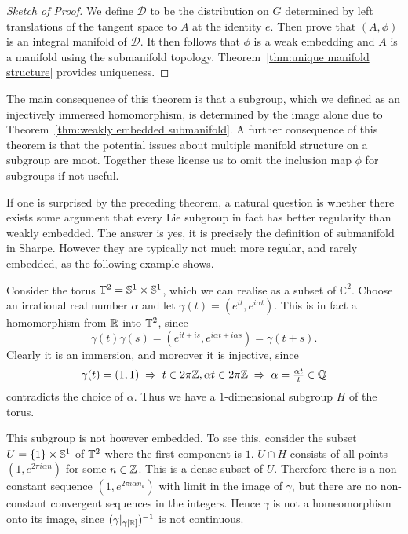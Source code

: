 \begin{proof}[Sketch of Proof]
We define $\mathcal{D}$ to be the distribution on $G$ determined by left translations of the tangent space to $A$ at the identity $e$. 
Then prove that $(A,\phi)$ is an integral manifold of $\mathcal{D}$. 
It then follows that $\phi$ is a weak embedding and $A$ is a manifold using the submanifold topology.
Theorem~\ref{thm:unique manifold structure} provides uniqueness.
\end{proof}

The main consequence of this theorem is that a subgroup, which we defined as an injectively immersed homomorphism, is determined by the image alone due to Theorem~\ref{thm:weakly embedded submanifold}.
A further consequence of this theorem is that the potential issues about multiple manifold structure on a subgroup are moot.
Together these license us to omit the inclusion map $\phi$ for subgroups if not useful.

If one is surprised by the preceding theorem, a natural question is whether there exists some argument that every Lie subgroup in fact has better regularity than weakly embedded.
The answer is yes, it is precisely the definition of submanifold in Sharpe.
However they are typically not much more regular, and rarely embedded, as the following example shows.

\begin{example}
\label{eg:dense subgroup in torus}
Consider the torus $\mathbb{T}^2 = \mathbb{S}^1 \times \mathbb{S}^1$, which we can realise as a subset of $\mathbb{C}^2$.
Choose an irrational real number $\alpha$ and let $\gamma(t) = (e^{it}, e^{i\alpha t})$.
This is in fact a homomorphism from $\mathbb{R}$ into $\mathbb{T}^2$, since
\[
\gamma(t)\gamma(s)
= (e^{it+is}, e^{i\alpha t+i\alpha s})
= \gamma(t+s).
\]
Clearly it is an immersion, and moreover it is injective, since
\[
\gamma(t) = (1,1)
\;\Rightarrow\;
t \in 2\pi\mathbb{Z}, \alpha t \in 2\pi\mathbb{Z}
\;\Rightarrow\;
\alpha = \tfrac{\alpha t}{t} \in \mathbb{Q}
\]
contradicts the choice of $\alpha$.
Thus we have a $1$-dimensional subgroup $H$ of the torus.

This subgroup is not however embedded.
To see this, consider the subset $U = \{1\}\times\mathbb{S}^1$ of $\mathbb{T}^2$ where the first component is $1$.
$U \cap H$ consists of all points $(1, e^{2\pi i\alpha n})$ for some $n \in \mathbb{Z}$.
This is a dense subset of $U$.
Therefore there is a non-constant sequence $(1, e^{2\pi i\alpha n_k})$ with limit in the image of $\gamma$, but there are no non-constant convergent sequences in the integers.
Hence $\gamma$ is not a homeomorphism onto its image, since $(\gamma|_{\gamma[\mathbb{R}]})^{-1}$ is not continuous.
\end{example}

